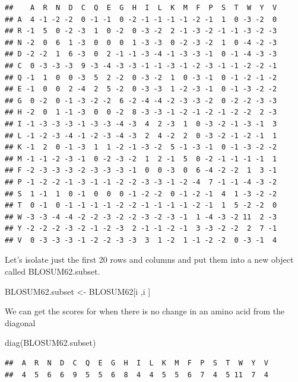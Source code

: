 \documentclass[
]{book}
\newenvironment{Shaded}{\begin{snugshade}}{\end{snugshade}}
\newcommand{\FunctionTok}[1]{\textcolor[rgb]{0.00,0.00,0.00}{#1}}
\newcommand{\NormalTok}[1]{#1}
\newcommand{\OtherTok}[1]{\textcolor[rgb]{0.56,0.35,0.01}{#1}}
\begin{document}
\begin{verbatim}
##    A  R  N  D  C  Q  E  G  H  I  L  K  M  F  P  S  T  W  Y  V
## A  4 -1 -2 -2  0 -1 -1  0 -2 -1 -1 -1 -1 -2 -1  1  0 -3 -2  0
## R -1  5  0 -2 -3  1  0 -2  0 -3 -2  2 -1 -3 -2 -1 -1 -3 -2 -3
## N -2  0  6  1 -3  0  0  0  1 -3 -3  0 -2 -3 -2  1  0 -4 -2 -3
## D -2 -2  1  6 -3  0  2 -1 -1 -3 -4 -1 -3 -3 -1  0 -1 -4 -3 -3
## C  0 -3 -3 -3  9 -3 -4 -3 -3 -1 -1 -3 -1 -2 -3 -1 -1 -2 -2 -1
## Q -1  1  0  0 -3  5  2 -2  0 -3 -2  1  0 -3 -1  0 -1 -2 -1 -2
## E -1  0  0  2 -4  2  5 -2  0 -3 -3  1 -2 -3 -1  0 -1 -3 -2 -2
## G  0 -2  0 -1 -3 -2 -2  6 -2 -4 -4 -2 -3 -3 -2  0 -2 -2 -3 -3
## H -2  0  1 -1 -3  0  0 -2  8 -3 -3 -1 -2 -1 -2 -1 -2 -2  2 -3
## I -1 -3 -3 -3 -1 -3 -3 -4 -3  4  2 -3  1  0 -3 -2 -1 -3 -1  3
## L -1 -2 -3 -4 -1 -2 -3 -4 -3  2  4 -2  2  0 -3 -2 -1 -2 -1  1
## K -1  2  0 -1 -3  1  1 -2 -1 -3 -2  5 -1 -3 -1  0 -1 -3 -2 -2
## M -1 -1 -2 -3 -1  0 -2 -3 -2  1  2 -1  5  0 -2 -1 -1 -1 -1  1
## F -2 -3 -3 -3 -2 -3 -3 -3 -1  0  0 -3  0  6 -4 -2 -2  1  3 -1
## P -1 -2 -2 -1 -3 -1 -1 -2 -2 -3 -3 -1 -2 -4  7 -1 -1 -4 -3 -2
## S  1 -1  1  0 -1  0  0  0 -1 -2 -2  0 -1 -2 -1  4  1 -3 -2 -2
## T  0 -1  0 -1 -1 -1 -1 -2 -2 -1 -1 -1 -1 -2 -1  1  5 -2 -2  0
## W -3 -3 -4 -4 -2 -2 -3 -2 -2 -3 -2 -3 -1  1 -4 -3 -2 11  2 -3
## Y -2 -2 -2 -3 -2 -1 -2 -3  2 -1 -1 -2 -1  3 -3 -2 -2  2  7 -1
## V  0 -3 -3 -3 -1 -2 -2 -3 -3  3  1 -2  1 -1 -2 -2  0 -3 -1  4
\end{verbatim}

Let's isolate just the first 20 rows and columns and put them into a new object called BLOSUM62.subset.

\begin{Shaded}
\begin{Highlighting}[]
\NormalTok{BLOSUM62.subset }\OtherTok{\textless{}{-}}\NormalTok{  BLOSUM62[i ,i ]}
\end{Highlighting}
\end{Shaded}

We can get the scores for when there is no change in an amino acid from the diagonal

\begin{Shaded}
\begin{Highlighting}[]
\FunctionTok{diag}\NormalTok{(BLOSUM62.subset)}
\end{Highlighting}
\end{Shaded}

\begin{verbatim}
##  A  R  N  D  C  Q  E  G  H  I  L  K  M  F  P  S  T  W  Y  V 
##  4  5  6  6  9  5  5  6  8  4  4  5  5  6  7  4  5 11  7  4
\end{verbatim}
\end{document}
